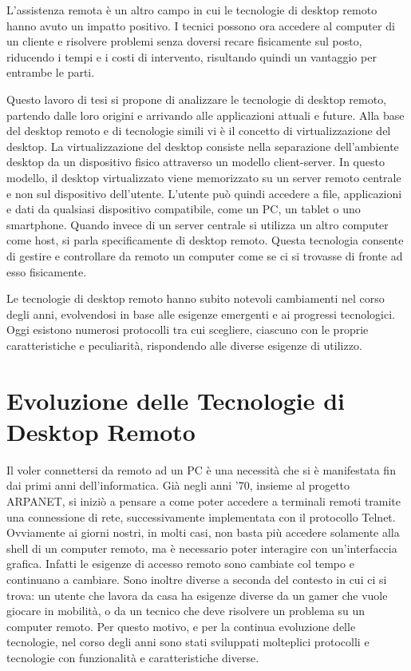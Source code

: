 \documentclass[12pt,a4paper,openright,twoside]{book}
\begin{document}
L'assistenza remota è un altro campo in cui le tecnologie di desktop remoto hanno avuto un impatto positivo. I tecnici possono ora accedere al computer di un cliente e risolvere problemi senza doversi recare fisicamente sul posto, riducendo i tempi e i costi di intervento, risultando quindi un vantaggio per entrambe le parti.

Questo lavoro di tesi si propone di analizzare le tecnologie di desktop remoto, partendo dalle loro origini e arrivando alle applicazioni attuali e future. Alla base del desktop remoto e di tecnologie simili vi è il concetto di virtualizzazione del desktop. La virtualizzazione del desktop consiste nella separazione dell'ambiente desktop da un dispositivo fisico attraverso un modello client-server. In questo modello, il desktop virtualizzato viene memorizzato su un server remoto centrale e non sul dispositivo dell'utente. L'utente può quindi accedere a file, applicazioni e dati da qualsiasi dispositivo compatibile, come un PC, un tablet o uno smartphone. %
Quando invece di un server centrale si utilizza un altro computer come host, si parla specificamente di desktop remoto. Questa tecnologia consente di gestire e controllare da remoto un computer come se ci si trovasse di fronte ad esso fisicamente.

Le tecnologie di desktop remoto hanno subito notevoli cambiamenti nel corso degli anni, evolvendosi in base alle esigenze emergenti e ai progressi tecnologici. Oggi esistono numerosi protocolli tra cui scegliere, ciascuno con le proprie caratteristiche e peculiarità, rispondendo alle diverse esigenze di utilizzo.



\chapter{Evoluzione delle Tecnologie di Desktop Remoto}
\label{chap:evolution}
Il voler connettersi da remoto ad un PC è una necessità che si è manifestata fin dai primi anni dell'informatica. Già negli anni '70, insieme al progetto ARPANET, si iniziò a pensare a come poter accedere a terminali remoti tramite una connessione di rete, successivamente implementata con il protocollo Telnet. 
Ovviamente ai giorni nostri, in molti casi, non basta più accedere solamente alla shell di un computer remoto, ma è necessario poter interagire con un'interfaccia grafica. Infatti le esigenze di accesso remoto sono cambiate col tempo e continuano a cambiare. Sono inoltre diverse a seconda del contesto in cui ci si trova: un utente che lavora da casa ha esigenze diverse da un gamer che vuole giocare in mobilità, o da un tecnico che deve risolvere un problema su un computer remoto. Per questo motivo, e per la continua evoluzione delle tecnologie, nel corso degli anni sono stati sviluppati molteplici protocolli e tecnologie con funzionalità e caratteristiche diverse.
\end{document}
